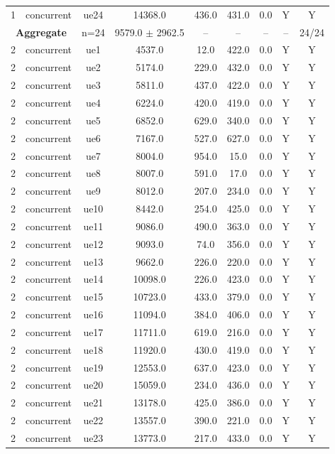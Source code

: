 \begin{table}[ht]
\begin{tabular}{|c|c|c|c|c|c|c|c|c|}
1 & concurrent & ue24 & 14368.0 & 436.0 & 431.0 & 0.0 & Y & Y \\
\multicolumn{2}{|c|}{\textbf{Aggregate}} & n=24 & 9579.0 $\pm$ 2962.5 & -- & -- & -- & -- & 24/24 \\
\hline
2 & concurrent & ue1 & 4537.0 & 12.0 & 422.0 & 0.0 & Y & Y \\
2 & concurrent & ue2 & 5174.0 & 229.0 & 432.0 & 0.0 & Y & Y \\
2 & concurrent & ue3 & 5811.0 & 437.0 & 422.0 & 0.0 & Y & Y \\
2 & concurrent & ue4 & 6224.0 & 420.0 & 419.0 & 0.0 & Y & Y \\
2 & concurrent & ue5 & 6852.0 & 629.0 & 340.0 & 0.0 & Y & Y \\
2 & concurrent & ue6 & 7167.0 & 527.0 & 627.0 & 0.0 & Y & Y \\
2 & concurrent & ue7 & 8004.0 & 954.0 & 15.0 & 0.0 & Y & Y \\
2 & concurrent & ue8 & 8007.0 & 591.0 & 17.0 & 0.0 & Y & Y \\
2 & concurrent & ue9 & 8012.0 & 207.0 & 234.0 & 0.0 & Y & Y \\
2 & concurrent & ue10 & 8442.0 & 254.0 & 425.0 & 0.0 & Y & Y \\
2 & concurrent & ue11 & 9086.0 & 490.0 & 363.0 & 0.0 & Y & Y \\
2 & concurrent & ue12 & 9093.0 & 74.0 & 356.0 & 0.0 & Y & Y \\
2 & concurrent & ue13 & 9662.0 & 226.0 & 220.0 & 0.0 & Y & Y \\
2 & concurrent & ue14 & 10098.0 & 226.0 & 423.0 & 0.0 & Y & Y \\
2 & concurrent & ue15 & 10723.0 & 433.0 & 379.0 & 0.0 & Y & Y \\
2 & concurrent & ue16 & 11094.0 & 384.0 & 406.0 & 0.0 & Y & Y \\
2 & concurrent & ue17 & 11711.0 & 619.0 & 216.0 & 0.0 & Y & Y \\
2 & concurrent & ue18 & 11920.0 & 430.0 & 419.0 & 0.0 & Y & Y \\
2 & concurrent & ue19 & 12553.0 & 637.0 & 423.0 & 0.0 & Y & Y \\
2 & concurrent & ue20 & 15059.0 & 234.0 & 436.0 & 0.0 & Y & Y \\
2 & concurrent & ue21 & 13178.0 & 425.0 & 386.0 & 0.0 & Y & Y \\
2 & concurrent & ue22 & 13557.0 & 390.0 & 221.0 & 0.0 & Y & Y \\
2 & concurrent & ue23 & 13773.0 & 217.0 & 433.0 & 0.0 & Y & Y \\

\end{tabular}
\end{table}
